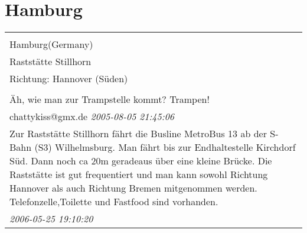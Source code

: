 \documentclass[a4paper,12pt]{article}
\begin{document}
\section{Hamburg}
\begin{tabular}{|p{13cm}|}
\hline\\
Hamburg(Germany)\\
Raststätte Stillhorn\\
Richtung: Hannover (Süden) \\
\hline\\
Äh, wie man zur Trampstelle kommt? Trampen!
\\
chattykiss@gmx.de \textit{ 2005-08-05 21:45:06 }\\\hline Zur Raststätte Stillhorn fährt die Busline MetroBus 13 ab der S-Bahn (S3) Wilhelmsburg.
Man fährt bis zur Endhaltestelle Kirchdorf Süd.
Dann noch ca 20m geradeaus über eine kleine Brücke.
Die Raststätte ist gut frequentiert und man kann sowohl Richtung Hannover als auch Richtung Bremen mitgenommen werden. Telefonzelle,Toilette und Fastfood sind vorhanden. \\
\textit{ 2006-05-25 19:10:20 }\\\hline
\end{tabular}
\end{document}
